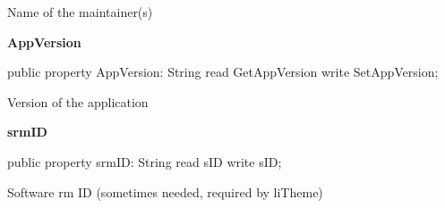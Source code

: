 \documentclass{report}
\newif\ifpdf
\begin{document}
\begin{list}{}
\begin{flushleft}
\ifpdf
\end{flushleft}
\fi


\par Name of the maintainer(s)\label{common.TListEntry-AppVersion}
\item[\textbf{AppVersion}\hfill]
\ifpdf
\begin{flushleft}
\fi
\begin{ttfamily}
public property AppVersion: String read GetAppVersion write SetAppVersion;\end{ttfamily}

\ifpdf
\end{flushleft}
\fi


\par Version of the application\label{common.TListEntry-srmID}
\item[\textbf{srmID}\hfill]
\ifpdf
\begin{flushleft}
\fi
\begin{ttfamily}
public property srmID: String read sID write sID;\end{ttfamily}

\ifpdf
\end{flushleft}
\fi


\par Software rm ID (sometimes needed, required by liTheme)\end{list}
\end{document}
